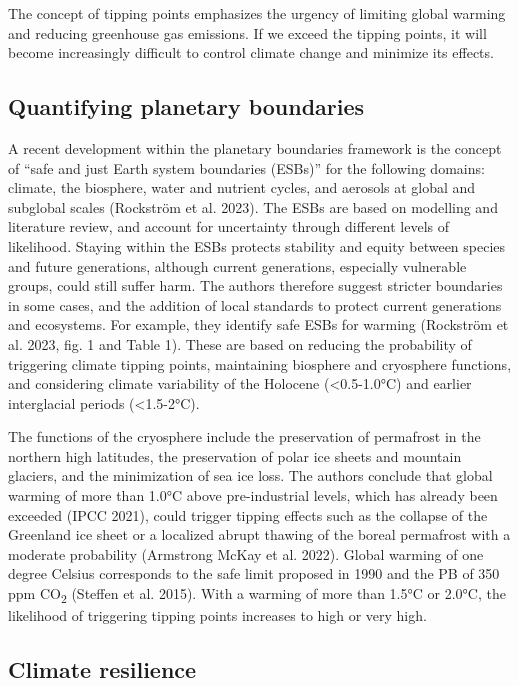 \documentclass[
  a4paper,
  DIV=11,
  numbers=noendperiod,
  oneside,
  openany]{scrreprt}
\begin{document}
The concept of tipping points emphasizes the urgency of limiting global
warming and reducing greenhouse gas emissions. If we exceed the tipping
points, it will become increasingly difficult to control climate change
and minimize its effects.

\subsection{Quantifying planetary
boundaries}\label{quantifying-planetary-boundaries}

A recent development within the planetary boundaries framework is the
concept of ``safe and just Earth system boundaries (ESBs)'' for the
following domains: climate, the biosphere, water and nutrient cycles,
and aerosols at global and subglobal scales (Rockström et al. 2023). The
ESBs are based on modelling and literature review, and account for
uncertainty through different levels of likelihood. Staying within the
ESBs protects stability and equity between species and future
generations, although current generations, especially vulnerable groups,
could still suffer harm. The authors therefore suggest stricter
boundaries in some cases, and the addition of local standards to protect
current generations and ecosystems. For example, they identify safe ESBs
for warming (Rockström et al. 2023, fig. 1 and Table 1). These are based
on reducing the probability of triggering climate tipping points,
maintaining biosphere and cryosphere functions, and considering climate
variability of the Holocene (\textless0.5-1.0°C) and earlier
interglacial periods (\textless1.5-2°C).

The functions of the cryosphere include the preservation of permafrost
in the northern high latitudes, the preservation of polar ice sheets and
mountain glaciers, and the minimization of sea ice loss. The authors
conclude that global warming of more than 1.0°C above pre-industrial
levels, which has already been exceeded (IPCC 2021), could trigger
tipping effects such as the collapse of the Greenland ice sheet or a
localized abrupt thawing of the boreal permafrost with a moderate
probability (Armstrong McKay et al. 2022). Global warming of one degree
Celsius corresponds to the safe limit proposed in 1990 and the PB of 350
ppm CO\textsubscript{2} ({Steffen et al.} 2015). With a warming of more
than 1.5°C or 2.0°C, the likelihood of triggering tipping points
increases to high or very high.

\subsection{Climate resilience}\label{climate-resilience}
\end{document}
